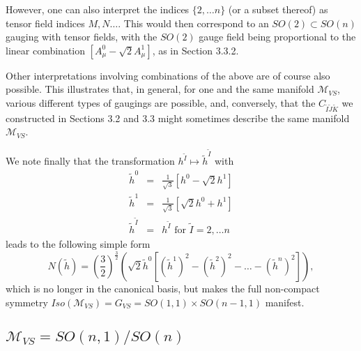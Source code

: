 \documentclass[a4paper,11pt]{article}
\newcommand{\ti}{\ensuremath{\tilde{I}}}
\newcommand{\tj}{\ensuremath{\tilde{J}}}
\newcommand{\tk}{\ensuremath{\tilde{K}}}
\newcommand{\M}{\ensuremath{\mathcal{M}}}
\begin{document}
\begin{appendix}
However, one can also interpret the indices $\{2,\ldots n\}$ (or a
subset thereof) as tensor field indices $M,N\ldots$. This would
then correspond to an $SO(2) \subset SO(n)$ gauging with tensor
fields, with the $SO(2)$ gauge field being proportional to the
linear combination $[A_{\mu}^{0}-\sqrt{2}A_{\mu}^{1}]$, as in
Section 3.3.2.

Other interpretations involving combinations of the above are of
course also possible. This illustrates    that, in general,  for one and
the same manifold $\M_{VS}$, various different types of gaugings are possible,
and, conversely,  that the $C_{\ti\tj\tk}$ we constructed in Sections 3.2
and 3.3 might sometimes describe the same manifold $\M_{VS}$.

We note finally that
the transformation $h^{\ti}\mapsto {\tilde{h}}^{\ti}$ with
\begin{eqnarray}
{\tilde{h}}^{0}&=&\frac{1}{\sqrt{3}}[h^{0}-\sqrt{2}h^{1}]\nonumber\\
{\tilde{h}}^{1}&=&\frac{1}{\sqrt{3}}[\sqrt{2}h^{0}+h^{1}]\nonumber\\
{\tilde{h}}^{\ti}&=&h^{\ti} \textrm{ for } \ti=2,\ldots n\nonumber
\end{eqnarray}
leads to the following simple form 
\begin{displaymath}
N(\tilde{h})=\left(\frac{3}{2}\right)^{\frac{3}{2}}\left( 
\sqrt{2}{\tilde{h}}^{0}
[({\tilde{h}}^{1})^{2}-
({\tilde{h}}^{2})^{2}-\ldots -({\tilde{h}}^{n})^{2}]\right),
\end{displaymath}
which is no longer in the canonical
basis, but makes the full non-compact symmetry
$Iso(\M_{VS})=G_{VS}=SO(1,1)\times SO(n-1,1)$ manifest.


\subsection{$\M_{VS}=SO(n,1)/SO(n)$}


\end{appendix}
\end{document}
